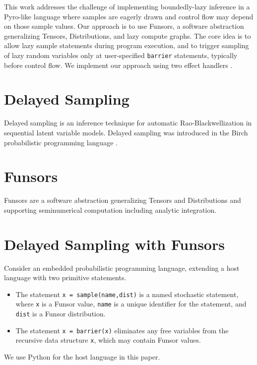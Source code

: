 \documentclass[anonymous=false, %
               format=acmsmall, %
               review=true, %
               screen=true, %
               nonacm=true]{acmart}
\begin{document}
This work addresses the challenge of implementing boundedly-lazy inference in a Pyro-like language where samples are eagerly drawn and control flow may depend on those sample values.
Our approach is to use Funsors, a software abstraction generalizing Tensors, Distributions, and lazy compute graphs.
The core idea is to allow lazy sample statements during program execution, and to trigger sampling of lazy random variables only at user-specified \verb$barrier$ statements, typically before control flow.
We implement our approach using two effect handlers \cite{moore2018effect,pretnar2015introduction}.

\section{Delayed Sampling}

Delayed sampling \cite{murray2017delayed} is an inference technique for automatic Rao-Blackwellization in sequential latent variable models.
Delayed sampling was introduced in the Birch probabilistic programming language \cite{murray2018automated}.

\section{Funsors}

Funsors \cite{obermeyer2019functional} are a software abstraction generalizing Tensors and Distributions and supporting seminumerical computation including analytic integration.

\section{Delayed Sampling with Funsors}

Consider an embedded probabilistic programming language, extending a host language with two primitive statements.
\begin{itemize}
  \item The statement \verb$x = sample(name,dist)$ is a named stochastic statement, where \verb$x$ is a Funsor value, \verb$name$ is a unique identifier for the statement, and \verb$dist$ is a Funsor distribution.
  \item The statement \verb$x = barrier(x)$ eliminates any free variables from the recursive data structure \verb$x$, which may contain Funsor values.
\end{itemize}
We use Python for the host language in this paper.
\end{document}
